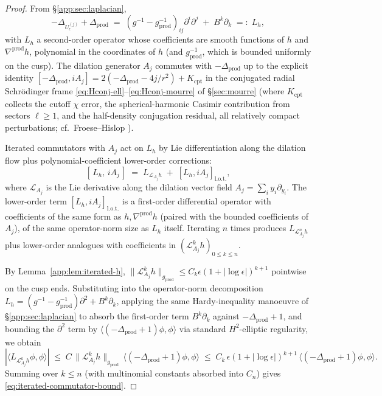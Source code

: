 \documentclass[11pt,letterpaper]{article}
\theoremstyle{definition}
\newcommand{\Lap}{\Delta}
\begin{document}
\begin{proof}
From \S\ref{app:sec:laplacian},
\[
-\Lap_{U_\epsilon^{(j)}} + \Lap_{\mathrm{prod}} \;=\; (g^{-1} - g_{\mathrm{prod}}^{-1})_{ij}\partial^i\partial^j \;+\; B^k\partial_k \;=:\; L_h,
\]
with $L_h$ a second-order operator whose coefficients are smooth functions of $h$ and $\nabla^{\mathrm{prod}}h$, polynomial in the coordinates of $h$ (and $g_{\mathrm{prod}}^{-1}$, which is bounded uniformly on the cusp). The dilation generator $A_j$ commutes with $-\Lap_{\mathrm{prod}}$ up to the explicit identity $[-\Lap_{\mathrm{prod}}, iA_j] = 2(-\Lap_{\mathrm{prod}} - 4j/r^2) + K_{\mathrm{cpt}}$ in the conjugated radial Schr\"odinger frame \eqref{eq:Hconj-ell}--\eqref{eq:Hconj-mourre} of \S\ref{sec:mourre} (where $K_{\mathrm{cpt}}$ collects the cutoff $\chi$ error, the spherical-harmonic Casimir contribution from sectors $\ell\ge 1$, and the half-density conjugation residual, all relatively compact perturbations; cf.\ Froese--Hislop \cite{FroeseHislop1989}).

Iterated commutators with $A_j$ act on $L_h$ by Lie differentiation along the dilation flow plus polynomial-coefficient lower-order corrections:
\[
[\,L_h,\,iA_j\,] \;=\; L_{\mathcal{L}_{A_j} h}\;+\;[L_h, iA_j]_{\mathrm{l.o.t.}},
\]
where $\mathcal{L}_{A_j}$ is the Lie derivative along the dilation vector field $A_j = \sum_i y_i\partial_{y_i}$. The lower-order term $[L_h, iA_j]_{\mathrm{l.o.t.}}$ is a first-order differential operator with coefficients of the same form as $h, \nabla^{\mathrm{prod}}h$ (paired with the bounded coefficients of $A_j$), of the same operator-norm size as $L_h$ itself. Iterating $n$ times produces $L_{\mathcal{L}_{A_j}^n h}$ plus lower-order analogues with coefficients in $(\mathcal{L}_{A_j}^k h)_{0\le k\le n}$.

By Lemma~\ref{app:lem:iterated-h}, $\|\mathcal{L}_{A_j}^k h\|_{g_{\mathrm{prod}}}\le C_k\epsilon(1+|\log\epsilon|)^{k+1}$ pointwise on the cusp ends. Substituting into the operator-norm decomposition $L_h = (g^{-1} - g_{\mathrm{prod}}^{-1})\partial^2 + B^k\partial_k$, applying the same Hardy-inequality manoeuvre of \S\ref{app:sec:laplacian} to absorb the first-order term $B^k\partial_k$ against $-\Lap_{\mathrm{prod}}+1$, and bounding the $\partial^2$ term by $\langle(-\Lap_{\mathrm{prod}}+1)\phi,\phi\rangle$ via standard $H^2$-elliptic regularity, we obtain
\[
|\langle L_{\mathcal{L}_{A_j}^k h}\phi,\phi\rangle| \;\le\; C\,\|\mathcal{L}_{A_j}^k h\|_{g_{\mathrm{prod}}}\,\langle(-\Lap_{\mathrm{prod}}+1)\phi,\phi\rangle \;\le\; C_k\,\epsilon(1+|\log\epsilon|)^{k+1}\,\langle(-\Lap_{\mathrm{prod}}+1)\phi,\phi\rangle.
\]
Summing over $k\le n$ (with multinomial constants absorbed into $C_n$) gives \eqref{eq:iterated-commutator-bound}.


\end{proof}
\end{document}
